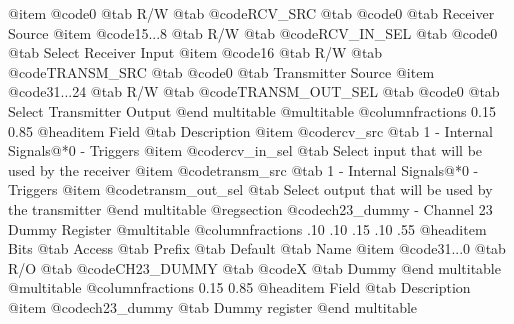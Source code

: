 @item @code{0}
@tab R/W @tab
@code{RCV_SRC}
@tab @code{0} @tab 
Receiver Source
@item @code{15...8}
@tab R/W @tab
@code{RCV_IN_SEL}
@tab @code{0} @tab 
Select Receiver Input
@item @code{16}
@tab R/W @tab
@code{TRANSM_SRC}
@tab @code{0} @tab 
Transmitter Source
@item @code{31...24}
@tab R/W @tab
@code{TRANSM_OUT_SEL}
@tab @code{0} @tab 
Select Transmitter Output
@end multitable
@multitable @columnfractions 0.15 0.85
@headitem Field @tab Description
@item @code{rcv_src} @tab 1 - Internal Signals@*0 - Triggers
@item @code{rcv_in_sel} @tab Select input that will be used by the receiver
@item @code{transm_src} @tab 1 - Internal Signals@*0 - Triggers
@item @code{transm_out_sel} @tab Select output that will be used by the transmitter
@end multitable
@regsection @code{ch23_dummy} - Channel 23 Dummy Register
@multitable @columnfractions .10 .10 .15 .10 .55
@headitem Bits @tab Access @tab Prefix @tab Default @tab Name
@item @code{31...0}
@tab R/O @tab
@code{CH23_DUMMY}
@tab @code{X} @tab 
Dummy
@end multitable
@multitable @columnfractions 0.15 0.85
@headitem Field @tab Description
@item @code{ch23_dummy} @tab Dummy register
@end multitable
